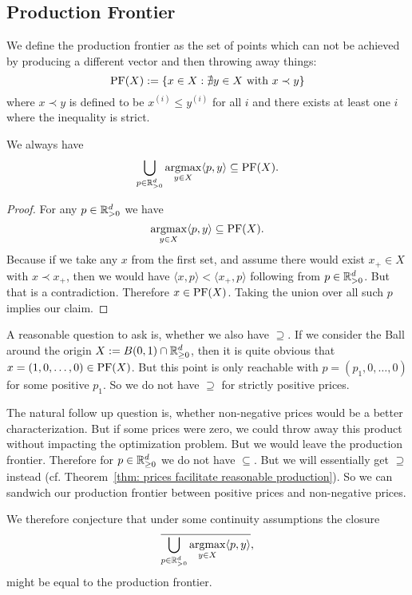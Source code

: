 \subsection{Production Frontier}
\label{sec: production frontier}

We define the production frontier as the set of points which can not be
achieved by producing a different vector and then throwing away things:
\[
	\operatorname{PF}(X) := \{ x\in X : \nexists y\in X \text{ with } x\prec y\}
\]
where \(x\prec y\) is defined to be \(x^{(i)} \le y^{(i)}\) for all \(i\) and
there exists at least one \(i\) where the inequality is strict.

\begin{theorem}
	We always have
	\[
		\bigcup_{p\in \mathbb{R}_{>0}^d} \operatorname*{argmax}_{y\in X}\langle p, y\rangle
		\subseteq \operatorname{PF}(X).
	\]
\end{theorem}
\begin{proof}
	For any \(p\in\mathbb{R}_{>0}^d\) we have
	\[
		\operatorname*{argmax}_{y\in X}\langle p, y\rangle \subseteq \operatorname{PF}(X).
	\]
	Because if we take any \(x\) from the first
	set, and assume there would exist \(x_+\in X\) with \(x\prec x_+\), then we
	would have \(\langle x, p\rangle < \langle x_+, p\rangle\) following from
	\(p\in \mathbb{R}_{>0}^d\). But that is a contradiction. Therefore
	\(x\in\operatorname{PF}(X)\). Taking the union over all such \(p\) implies our claim.
\end{proof}

A reasonable question to ask is, whether we also have \(\supseteq\). If we
consider the Ball around the origin \(X := B(0,1)\cap \mathbb{R}_{\ge 0}^d\),
then it is quite obvious that \(x=(1,0,\dots,0)\in \operatorname{PF}(X)\). But this point is
only reachable with \(p=(p_1,0,\dots,0)\) for some positive \(p_1\). So we do
not have \(\supseteq\) for strictly positive prices.

The natural follow up question is, whether non-negative prices would be a better
characterization. But if some prices were zero, we could throw away this product
without impacting the optimization problem. But we would leave the production
frontier. Therefore for \(p\in\mathbb{R}_{\ge 0}^d\) we do not have
\(\subseteq\). But we will essentially get \(\supseteq\) instead (cf.
Theorem~\ref{thm: prices facilitate reasonable production}). So we can sandwich
our production frontier between positive prices and non-negative prices.

We therefore conjecture that under some continuity assumptions the closure
\[
	\overline{\bigcup_{p\in\mathbb{R}_{>0}^d} \operatorname*{argmax}_{y\in X}\langle p,y\rangle},
\]
might be equal to the production frontier.

